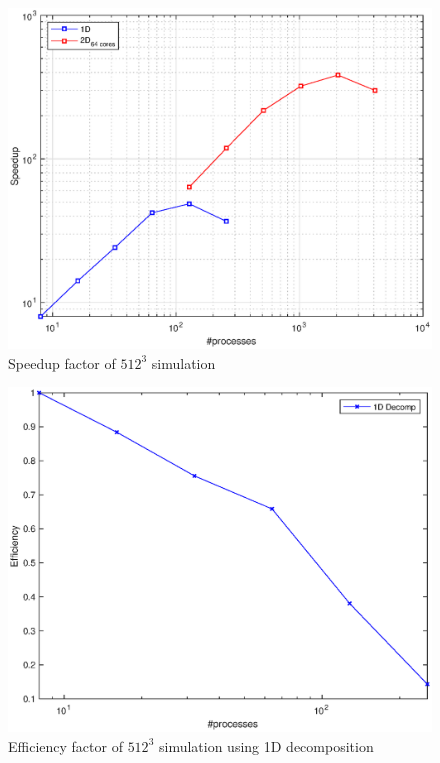 \begin{figure}
\begin{center}
\includegraphics[scale=0.6]{grafici/5122}
\caption{Speedup factor of $512^3$ simulation}
\label{5122}
\end{center}
\end{figure}

\begin{figure}
\begin{center}
\includegraphics[scale=0.6]{grafici/5123}
\caption{Efficiency factor of $512^3$ simulation using 1D decomposition}
\label{5123}
\end{center}
\end{figure}

